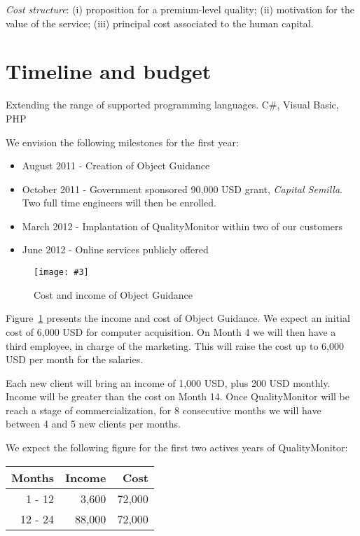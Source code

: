 \documentclass[runningheads]{llncs}
\newcommand{\fig}[4]{
	\begin{figure}[#1]
		\centering
		\texttt{[image: \#3]}
		\caption{\label{fig:#3}#4}
	\end{figure}}
\newcommand{\figref}[1]{Figure~\ref{fig:#1}}
\begin{document}
\noindent\emph{Cost structure}: (i) proposition for a premium-level quality; (ii) motivation for the value of the service; (iii) principal cost associated to the human capital. 

\section{Timeline and budget}

Extending the range of supported programming languages. C\#, Visual Basic, PHP

We envision the following milestones for the first year:

\begin{itemize}
\item August 2011 - Creation of Object Guidance
\item October 2011 - Government sponsored 90,000 USD grant, \emph{Capital Semilla}. Two full time engineers will then be enrolled. 
\item March 2012 - Implantation of QualityMonitor within two of our customers
\item June 2012 - Online services publicly offered 
\end{itemize}

\fig{}{1}{income}{Cost and income of Object Guidance}

\figref{income} presents the income and cost of Object Guidance. We expect an initial cost of 6,000 USD for computer acquisition. On Month 4 we will then have a third employee, in charge of the marketing. This will raise the cost up to 6,000 USD per month for the salaries. 

Each new client will bring an income of 1,000 USD, plus 200 USD monthly. Income will be greater than the cost on Month 14. Once QualityMonitor will be reach a stage of commercialization, for 8 consecutive months we will have between 4 and 5 new clients per months. 

We expect the following figure for the first two actives years of QualityMonitor:
\begin{center}
\begin{tabular}{|r|r|r|}
\hline
\textbf{Months} 	&	\textbf{Income}	& \textbf{Cost} \\\hline\hline
1 - 12	&	3,600	& 72,000\\\hline
12 - 24	&	88,000	& 72,000\\
\hline
\end{tabular}
\end{center}
\end{document}
